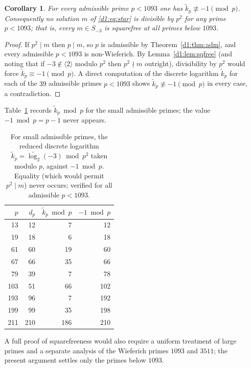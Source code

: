 \documentclass[a4paper]{article}
\theoremstyle{plain}
\newtheorem{corollary}{Corollary}[subsection]
\theoremstyle{definition}
\theoremstyle{remark}
\newcommand{\gen}[1]{\langle #1 \rangle}
\begin{document}
\begin{corollary}\label{d1:cor:sqfree}
For every admissible prime $p<1093$ one has $\widetilde{k}_{p}\not\equiv-1\pmod p$. Consequently
no solution $m$ of \eqref{d1:eq:star} is divisible by $p^{2}$ for any prime $p<1093$; that is, every
$m\in S_{-3}$ is squarefree at all primes below $1093$.
\end{corollary}

\begin{proof}
If $p^{2}\mid m$ then $p\mid m$, so $p$ is admissible by Theorem~\ref{d1:thm:adm}, and every
admissible $p<1093$ is non-Wieferich. By Lemma~\ref{d1:lem:sqfree} (and noting that if $-3\notin
\gen{2}$ modulo $p^{2}$ then $p^{2}\nmid m$ outright), divisibility by $p^{2}$ would force
$\widetilde{k}_{p}\equiv-1\pmod p$. A direct computation of the discrete logarithm
$\widetilde{k}_{p}$ for each of the $39$ admissible primes $p<1093$ shows
$\widetilde{k}_{p}\not\equiv-1\pmod p$ in every case, a contradiction.
\end{proof}

Table~\ref{d1:tab:sqfree} records $\widetilde{k}_{p}\bmod p$ for the small admissible primes; the
value $-1\bmod p=p-1$ never appears.

\begin{table}[H]
\centering
\small
\begin{tabular}{rrrr}
\toprule
$p$ & $d_{p}$ & $\widetilde{k}_{p}\bmod p$ & $-1\bmod p$ \\
\midrule
13  & 12  & 7   & 12  \\
19  & 18  & 6   & 18  \\
61  & 60  & 19  & 60  \\
67  & 66  & 35  & 66  \\
79  & 39  & 7   & 78  \\
103 & 51  & 66  & 102 \\
193 & 96  & 7   & 192 \\
199 & 99  & 35  & 198 \\
211 & 210 & 186 & 210 \\
\bottomrule
\end{tabular}
\caption{For small admissible primes, the reduced discrete logarithm
$\widetilde{k}_{p}=\widetilde{\log_{2}}(-3)\bmod p^{2}$ taken modulo $p$, against $-1\bmod p$.
Equality (which would permit $p^{2}\mid m$) never occurs; verified for all admissible $p<1093$.}
\label{d1:tab:sqfree}
\end{table}

A full proof of squarefreeness would also require a uniform treatment of large primes and a
separate analysis of the Wieferich primes $1093$ and $3511$; the present argument settles only
the primes below $1093$.
\end{document}
